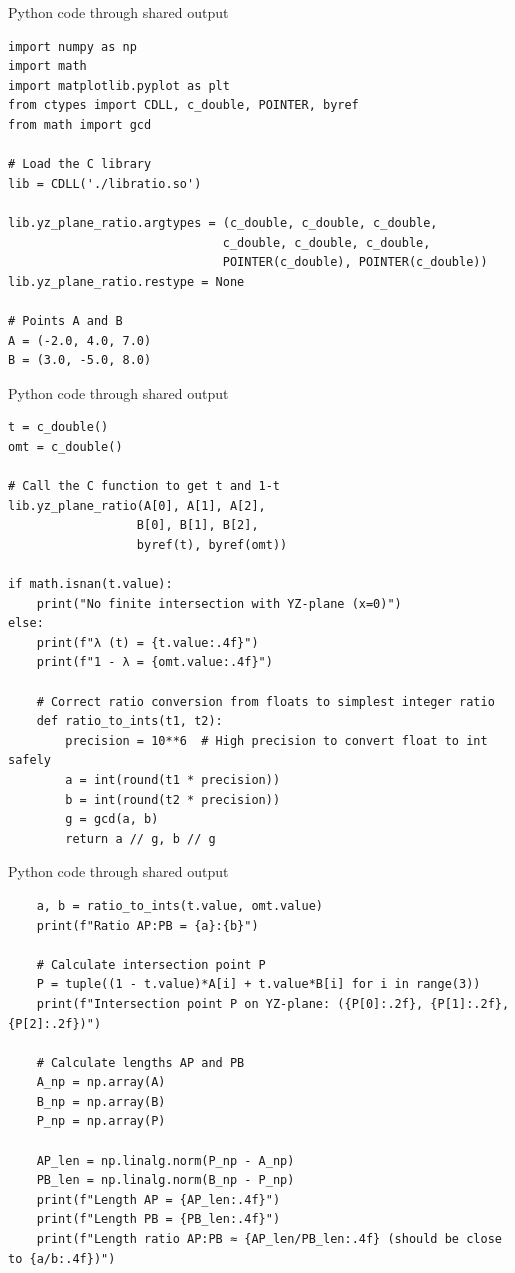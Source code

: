 \documentclass{beamer}
\begin{document}
\begin{frame}[fragile]{Python code through shared output}
\begin{lstlisting}
import numpy as np
import math
import matplotlib.pyplot as plt
from ctypes import CDLL, c_double, POINTER, byref
from math import gcd

# Load the C library
lib = CDLL('./libratio.so')

lib.yz_plane_ratio.argtypes = (c_double, c_double, c_double,
                              c_double, c_double, c_double,
                              POINTER(c_double), POINTER(c_double))
lib.yz_plane_ratio.restype = None

# Points A and B
A = (-2.0, 4.0, 7.0)
B = (3.0, -5.0, 8.0)
 \end{lstlisting}
\end{frame}
\begin{frame}[fragile]{Python code through shared output}
\begin{lstlisting}
t = c_double()
omt = c_double()

# Call the C function to get t and 1-t
lib.yz_plane_ratio(A[0], A[1], A[2],
                  B[0], B[1], B[2],
                  byref(t), byref(omt))

if math.isnan(t.value):
    print("No finite intersection with YZ-plane (x=0)")
else:
    print(f"λ (t) = {t.value:.4f}")
    print(f"1 - λ = {omt.value:.4f}")

    # Correct ratio conversion from floats to simplest integer ratio
    def ratio_to_ints(t1, t2):
        precision = 10**6  # High precision to convert float to int safely
        a = int(round(t1 * precision))
        b = int(round(t2 * precision))
        g = gcd(a, b)
        return a // g, b // g
 \end{lstlisting}
\end{frame}
\begin{frame}[fragile]{Python code through shared output}
\begin{lstlisting}
    a, b = ratio_to_ints(t.value, omt.value)
    print(f"Ratio AP:PB = {a}:{b}")

    # Calculate intersection point P
    P = tuple((1 - t.value)*A[i] + t.value*B[i] for i in range(3))
    print(f"Intersection point P on YZ-plane: ({P[0]:.2f}, {P[1]:.2f}, {P[2]:.2f})")

    # Calculate lengths AP and PB
    A_np = np.array(A)
    B_np = np.array(B)
    P_np = np.array(P)

    AP_len = np.linalg.norm(P_np - A_np)
    PB_len = np.linalg.norm(B_np - P_np)
    print(f"Length AP = {AP_len:.4f}")
    print(f"Length PB = {PB_len:.4f}")
    print(f"Length ratio AP:PB ≈ {AP_len/PB_len:.4f} (should be close to {a/b:.4f})")
 \end{lstlisting}
\end{frame}
\end{document}
